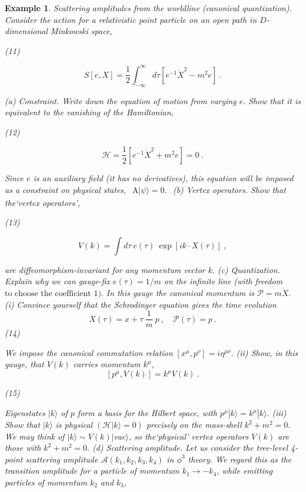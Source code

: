 \documentclass[10pt,
 article,
 amsmath,amssymb
]{revtex4-2}
\newtheorem{example}[theorem]{Example}
\begin{document}
\begin{example}
    
Scattering amplitudes from the worldline (canonical quantization).
Consider the action for a relativistic point particle on an open path in $D$-dimensional Minkowski
space,

(11)

$$S[e,X]=\frac{1}{2}\int_{-\infty}^{\infty}d\tau\left[e^{-1}\dot{X}^{2}-m^{2}e\right]\:.$$

(a) Constraint. Write down the equation of motion from varying $e.$ Show that it is equivalent
to the vanishing of the Hamiltonian,

(12)

$$\mathcal{H}=\frac12[e^{-1}\dot{X}^2+m^2e]=0\:.$$

Since $e$ is an auxiliary field (it has no derivatives), this equation will be imposed as a
constraint on physical states, $\begin{aligned}\text{A}|\psi\rangle=0.\end{aligned}$
(b) Vertex operators. Show that the‘vertex operators’,


(13)

$$V(k)=\int d\tau\:e(\tau)\:\exp\left[ik\cdot X(\tau)\right]\:,$$

are diffeomorphism-invariant for any momentum vector $k.$
(c) Quantization. Explain why we can gauge-fix $e(\tau)=1/m$ on the infinite line (with freedom
$\dot{\text{to choose the coefficient }1}).$ In this gauge the canonical momentum is $\mathcal{P}=m\dot{X}.$
(i) Convince yourself that the Schrodinger equation gives the time evolution
$$X(\tau)=x+\tau\:\frac{1}{m}\:p\:,\quad\mathcal{P}(\tau)=p\:.$$
(14)


We impose the canonical commutation relation $[x^\mu,p^\nu]=i\eta^{\mu\nu}.$
(ii) Show, in this gauge, that $V(k)$ carries momentum $k^\mu$,
$$[p^\mu,V(k)]=k^\mu V(k)\:.$$

(15)

Eigenstates $|k\rangle$ of $p$ form a basis for the Hilbert space, with $p^\mu|k\rangle=k^\mu|k\rangle.$
(iii) Show that $|k\rangle$ is physical $(\mathcal{H}|k\rangle=0)$ precisely on the mass-shell $k^2+m^2=0.$
We may think of $|k\rangle\sim V(k)|$vac$\rangle$, so the‘physical’ vertex operators $V(k)$ are those with
$k^2+m^2=0.$
(d) Scattering amplitude. Let us consider the tree-level 4-point scattering amplitude $\mathcal{A}(k_1,k_2,k_3,k_4)$
in $\phi ^3$ theory. We regard this as the transition amplitude for a particle of momentum
$k_1\to-k_4$, while emitting particles of momentum $k_2$ and $k_3$,



\end{example}
\end{document}
